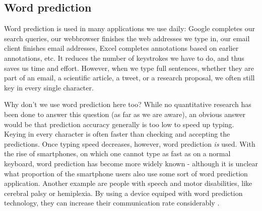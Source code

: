 \documentclass[12pt]{article}
\begin{document}
\subsection{Word prediction} \label{wordprediction}

Word prediction is used in many applications we use daily: Google completes our search queries, our webbrowser finishes the web addresses we type in, our email client finishes email addresses, Excel completes annotations based on earlier annotations, etc. It reduces the number of keystrokes we have to do, and thus saves us time and effort. However, when we type full sentences, whether they are part of an email, a scientific article, a tweet, or a research proposal, we often still key in every single character. 

Why don't we use word prediction here too? While no quantitative research has been done to answer this question (as far as we are aware), an obvious answer would be that prediction accuracy generally is too low to speed up typing. Keying in every character is often faster than checking and accepting the predictions. Once typing speed decreases, however, word prediction \emph{is} used. With the rise of smartphones,  on which one  cannot type as fast as on a normal keyboard, word prediction has become more widely known - although it is unclear what proportion of the smartphone users also use some sort of word prediction application. Another example are  people with speech and motor disabilities, like cerebral palsy or hemiplexia. By using a device equiped with word prediction technology, they can increase their communication rate considerably \cite{Garay-Vitoria+06}.

\end{document}
